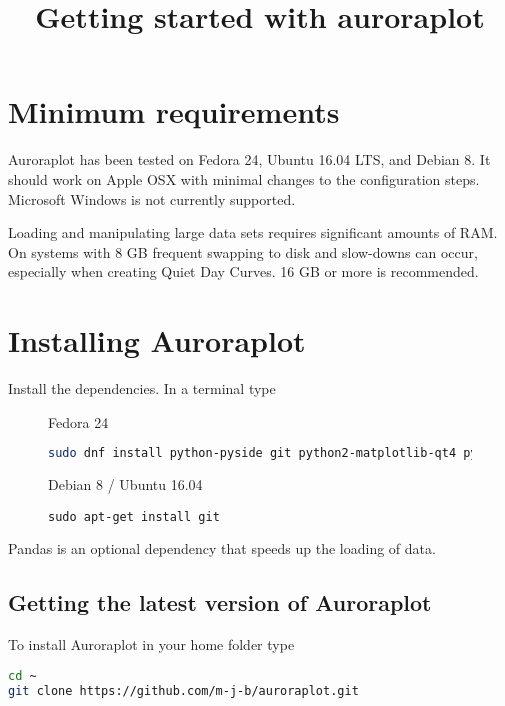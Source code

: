 \documentclass{article}
\begin{document}
\title{Getting started with auroraplot}
\date{}
\maketitle

\section{Minimum requirements}
Auroraplot has been tested on Fedora 24, Ubuntu 16.04 LTS, and Debian 8.
It should work on Apple OSX with minimal changes to the configuration steps.
Microsoft Windows is not currently supported.

Loading and manipulating large data sets requires significant amounts of RAM.
On systems with 8 GB frequent swapping to disk and slow-downs can occur,
especially when creating Quiet Day Curves. 16 GB or more is recommended.

\section{Installing Auroraplot}

Install the dependencies. In a terminal type

\begin{figure}[htb!]
\begin{minipage}[b]{0.45\linewidth}
Fedora 24
\begin{lstlisting}[language=Bash]
sudo dnf install python-pyside git python2-matplotlib-qt4 python-requests ipython python-scipy python-pandas
\end{lstlisting}
\end{minipage}
\hspace{0.5cm}
\begin{minipage}[b]{0.45\linewidth}
Debian 8 / Ubuntu 16.04
\begin{lstlisting}                 
sudo apt-get install git
\end{lstlisting}
\end{minipage} 
\end{figure}

Pandas is an optional dependency that speeds up the loading of data.

\subsection{Getting the latest version of Auroraplot}
To install Auroraplot in your home folder type
\begin{lstlisting}[language=Bash]
cd ~
git clone https://github.com/m-j-b/auroraplot.git
\end{lstlisting}
\end{document}
